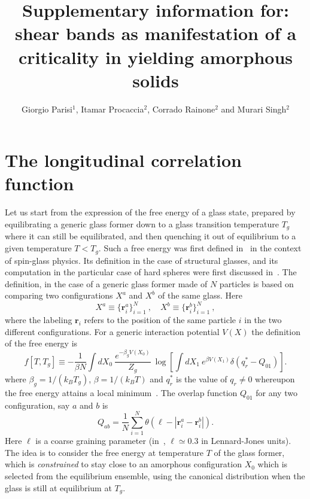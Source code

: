 \documentclass[aps,pnas,float]{revtex4}
\newcommand{\B}[1]{{\bm{#1}}}%
\begin{document}
\title{Supplementary information for: shear bands as manifestation of a criticality in yielding amorphous solids}

\author{Giorgio Parisi$^1$, Itamar Procaccia$^2$, Corrado Rainone$^2$ and Murari Singh$^2$ }
\maketitle

\section{The longitudinal correlation function}

Let us start from the expression of the free energy of a glass state, prepared by equilibrating a generic glass former down to a glass transition temperature $T_g$ where it can still be equilibrated, and then quenching it out of equilibrium to a given temperature $T<T_g$. Such a free energy was first defined in~\cite{FP95} in the context of spin-glass physics. Its definition in the case of structural glasses, and its computation in the particular case of hard spheres were first discussed in~\cite{RUYZ15}. The definition, in the case of a generic glass former made of $N$ particles is based on comparing two configurations $X^a$ and $X^b$ of the same glass. Here
\begin{equation}
X^a \equiv \{\B r_i^a\}_{i=1}^N \ , \quad X^b \equiv \{\B r^b_i\}_{i=1}^N \ ,
\end{equation}
where the labeling $\B r_i$ refers to the position of the same particle $i$ in the two different configurations.
For a generic interaction potential $V(X)$ the definition of the free energy is
\begin{equation}
f[T,T_g] \equiv -\frac{1}{\beta N} \int dX_0\ \frac{e^{-\beta_g V(X_0)}}{Z_g}\ \log\left[\int dX_1\ e^{\beta V(X_1)}\delta(q^*_r - Q_{01})\right].
\label{eq:FP}
\end{equation}
where $\beta_g=1/(k_B T_g)$, $\beta=1/(k_B T)$ and $q^*_r$ is the value of $q_r \neq 0$ whereupon the free energy attains a local minimum~\cite{RUYZ15}.
The overlap function $Q_{01}$ for any two configuration, say $a$ and $b$ is~\cite{JPRS16}
\begin{equation}
 Q_{ab} = \frac{1}{N}\sum_{i=1}^N \theta(\ell-|\boldsymbol{r}^a_i - \boldsymbol{r}^b_i|).
\end{equation}
Here $\ell$ is a coarse graining parameter (in~\cite{JPRS16}, $\ell
\simeq 0.3$ in Lennard-Jones units).
The idea is to consider the free energy at temperature $T$ of the glass former, which is \emph{constrained} to stay close to an amorphous configuration $X_0$ which is selected from the equilibrium ensemble, using the canonical distribution when the glass is still at equilibrium at $T_g$.
\end{document}
